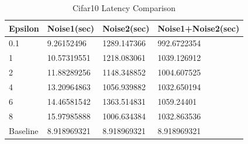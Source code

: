 \begin{table}[h!]
  \begin{center}
    \caption{Cifar10 Latency Comparison}
    \label{tab:table}
    \begin{tabular}{l|l|l|l}
      \textbf{Epsilon} & \textbf{Noise1(sec)} & \textbf{Noise2(sec)} & \textbf{Noise1+Noise2(sec)}\\
      \hline
0.1&	9.26152496&	1289.147366&	992.6722354\\
1&	10.57319551&	1218.083061&	1039.126912\\
2&	11.88289256&	1148.348852&	1004.607525\\
4&	13.20964863&	1056.939882&	1032.650194\\
6&	14.46581542&	1363.514831&	1059.24401\\
8&	15.97985888&	1006.634384&	1032.863536\\
Baseline&	8.918969321	&8.918969321&	8.918969321\\      
    \end{tabular}
   \end{center}
\end{table}
\cleardoublepage


\cleardoublepage


